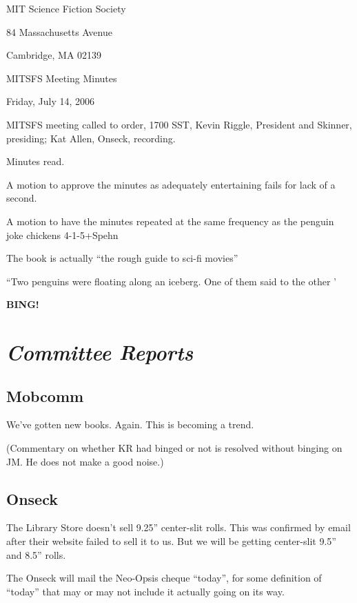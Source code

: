 \documentclass[10pt]{article}
\newcommand{\bing}{{\bf BING!} }
\newcommand{\goto}[1]{\bing \vskip 12pt \section*{{\em{#1}}}}
\begin{document}
\begin{center}

MIT Science Fiction Society

84 Massachusetts Avenue

Cambridge, MA 02139

\vspace{12pt}

MITSFS Meeting Minutes

Friday, July  14, 2006

\end{center}

\vspace{18pt}

\setlength{\parskip}{6pt}

\noindent
MITSFS meeting called to order, 1700 SST,
Kevin Riggle, President and Skinner, presiding; Kat Allen, Onseck, recording.

Minutes read.

A motion to approve the minutes as adequately entertaining fails for
lack of a second.

A motion to have the minutes repeated at the same frequency as the
penguin joke chickens 4-1-5+Spehn

The book is actually ``the rough guide to sci-fi movies''

``Two penguins were floating along an iceberg. One of them said to the
other '

\goto{Committee Reports}

\subsection*{Mobcomm}
We've gotten new books. Again. This is becoming a trend.

(Commentary on whether KR had binged or not is resolved without
binging on JM. He does not make a good noise.)

\subsection*{Onseck}
The Library Store doesn't sell 9.25'' center-slit rolls. This was
confirmed by email after their website failed to sell it to us.
But we will be getting center-slit 9.5'' and 8.5'' rolls.

The Onseck will mail the Neo-Opsis cheque ``today'', for some
definition of ``today'' that may or may not include it actually going
on its way.

\end{document}
